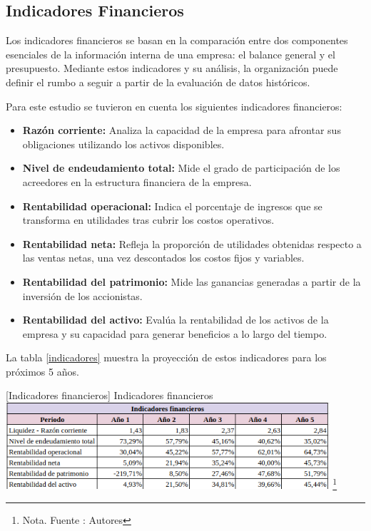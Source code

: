 \subsection{Indicadores Financieros}

Los indicadores financieros se basan en la comparación entre dos componentes esenciales de la información interna de una empresa: el balance general y el presupuesto. Mediante estos indicadores y su análisis, la organización puede definir el rumbo a seguir a partir de la evaluación de datos históricos.

Para este estudio se tuvieron en cuenta los siguientes indicadores financieros:

\begin{itemize}
    \item \textbf{Razón corriente: } Analiza la capacidad de la empresa para afrontar sus obligaciones utilizando los activos disponibles.
    
    \item \textbf{Nivel de endeudamiento total: } Mide el grado de participación de los acreedores en la estructura financiera de la empresa.
    
    \item \textbf{Rentabilidad operacional: } Indica el porcentaje de ingresos que se transforma en utilidades tras cubrir los costos operativos.
    
    \item \textbf{Rentabilidad neta: } Refleja la proporción de utilidades obtenidas respecto a las ventas netas, una vez descontados los costos fijos y variables.
    
    \item \textbf{Rentabilidad del patrimonio: } Mide las ganancias generadas a partir de la inversión de los accionistas.
    
    \item \textbf{Rentabilidad del activo:} Evalúa la rentabilidad de los activos de la empresa y su capacidad para generar beneficios a lo largo del tiempo.
\end{itemize}

La tabla \ref{indicadores} muestra la proyección de estos indicadores para los próximos 5 años.

\vspace{2mm}
\begin{minipage}{0.9\textwidth}
\centering
{}[{Indicadores financieros}]{ Indicadores financieros}
\label{indicadores}
\includegraphics[width=0.9\textwidth]{Content/Images/AF/IndicadoresFinancieros.png}
\footnote{Nota. \textup{Fuente : Autores}}
\end{minipage}

